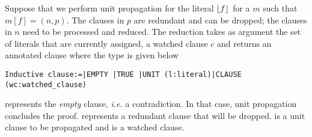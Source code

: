 \documentclass[utf8,a4paper,UKenglish,cleveref, autoref, thm-restate]{lipics-v2021}
\begin{document}
Suppose that we perform unit propagation for the literal
$\lfloor f \rfloor$ for a  $m$ such that $m[f] = (n,p)$.
The clauses in $p$ are redundant and can be dropped; the clauses in $n$
need to be processed and reduced. The reduction takes as argument the
set of literals that are currently assigned, a watched clause $c$ and
returns an annotated clause  where the type
 is given below
\begin{verbatim}
Inductive clause:=|EMPTY |TRUE |UNIT (l:literal)|CLAUSE (wc:watched_clause)
\end{verbatim}
 represents the \emph{empty} clause, \emph{i.e.} a
contradiction. In that case, unit propagation concludes the proof.
%
 represents a redundant clause that will be dropped.
%
 is a unit clause to be propagated and  is a watched clause.
\end{document}
